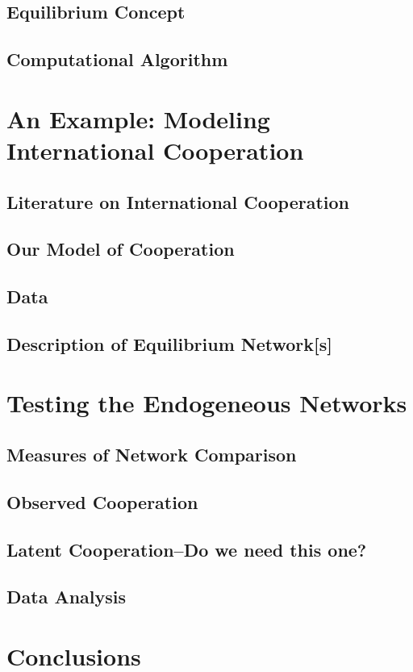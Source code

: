 \documentclass[12pt,onesided,fullpage]{amsart}
\begin{document}
\subsection{Equilibrium Concept}
\subsection{Computational Algorithm}

\section{An Example: Modeling International Cooperation}
\subsection{Literature on International Cooperation}
\subsection{Our Model of Cooperation}
\subsection{Data}
\subsection{Description of Equilibrium Network[s]}

\section{Testing the Endogeneous Networks}
\subsection{Measures of Network Comparison}
\subsection{Observed Cooperation}
\subsection{Latent Cooperation--Do we need this one?}
\subsection{Data Analysis}

\section{Conclusions}
\end{document}
